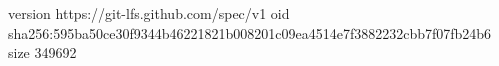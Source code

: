version https://git-lfs.github.com/spec/v1
oid sha256:595ba50ce30f9344b46221821b008201c09ea4514e7f3882232cbb7f07fb24b6
size 349692
